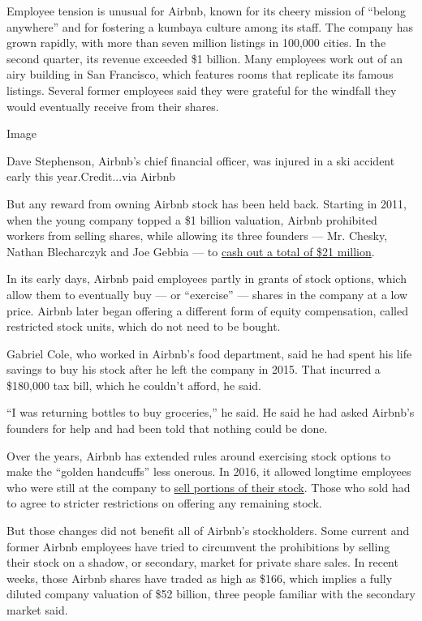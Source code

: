 Employee tension is unusual for Airbnb, known for its cheery mission of
``belong anywhere'' and for fostering a kumbaya culture among its staff.
The company has grown rapidly, with more than seven million listings in
100,000 cities. In the second quarter, its revenue exceeded \$1 billion.
Many employees work out of an airy building in San Francisco, which
features rooms that replicate its famous listings. Several former
employees said they were grateful for the windfall they would eventually
receive from their shares.

Image

Dave Stephenson, Airbnb's chief financial officer, was injured in a ski
accident early this year.Credit...via Airbnb

But any reward from owning Airbnb stock has been held back. Starting in
2011, when the young company topped a \$1 billion valuation, Airbnb
prohibited workers from selling shares, while allowing its three
founders --- Mr. Chesky, Nathan Blecharczyk and Joe Gebbia --- to
\href{http://allthingsd.com/20111001/vcs-unite-chamath-palihapitiya-decries-airbnbs-recent-112m-funding-for-excessive-founder-control-and-cashout-in-email/}{cash
out a total of \$21 million}.

In its early days, Airbnb paid employees partly in grants of stock
options, which allow them to eventually buy --- or ``exercise'' ---
shares in the company at a low price. Airbnb later began offering a
different form of equity compensation, called restricted stock units,
which do not need to be bought.

Gabriel Cole, who worked in Airbnb's food department, said he had spent
his life savings to buy his stock after he left the company in 2015.
That incurred a \$180,000 tax bill, which he couldn't afford, he said.

``I was returning bottles to buy groceries,'' he said. He said he had
asked Airbnb's founders for help and had been told that nothing could be
done.

Over the years, Airbnb has extended rules around exercising stock
options to make the ``golden handcuffs'' less onerous. In 2016, it
allowed longtime employees who were still at the company to
\href{https://www.nytimes3xbfgragh.onion/2016/08/12/technology/airbnb-and-others-set-terms-for-employees-to-cash-out.html}{sell
portions of their stock}. Those who sold had to agree to stricter
restrictions on offering any remaining stock.

But those changes did not benefit all of Airbnb's stockholders. Some
current and former Airbnb employees have tried to circumvent the
prohibitions by selling their stock on a shadow, or secondary, market
for private share sales. In recent weeks, those Airbnb shares have
traded as high as \$166, which implies a fully diluted company valuation
of \$52 billion, three people familiar with the secondary market said.

